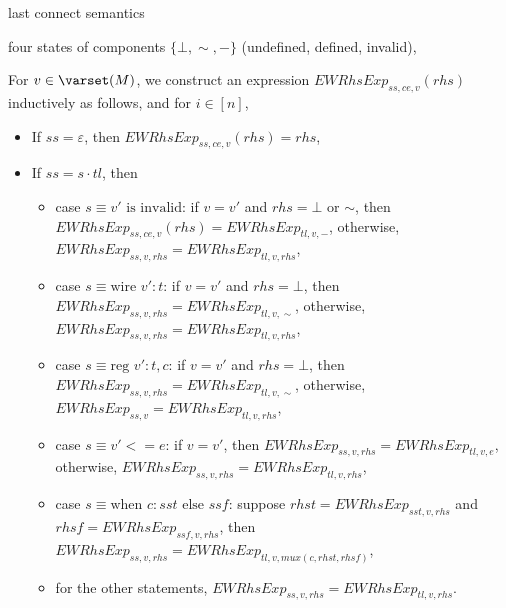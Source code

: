 {last connect semantics

four states of components $\{\bot, \sim, -\}$ (undefined, defined, invalid),

For $v \in \varset(M)$, we construct an expression $EWRhsExp_{ss, ce, v}(rhs)$ inductively as follows,
and for $i \in [n]$,
\begin{itemize}
\item If $ss = \varepsilon$, then $EWRhsExp_{ss, ce, v}(rhs) = rhs$,
%
\item If $ss = s \cdot tl$, then
\begin{itemize}
\item case $s \equiv v' \mbox{ is invalid}$: if $v = v'$ and $rhs = \bot$ or $\sim$, then $EWRhsExp_{ss, ce, v}(rhs) = EWRhsExp_{tl, v, -}$, otherwise, $EWRhsExp_{ss, v, rhs} = EWRhsExp_{tl, v, rhs}$,
%
\item case $s \equiv \mbox{wire } v': t$: if $v = v'$ and $rhs = \bot$, then $EWRhsExp_{ss, v, rhs} = EWRhsExp_{tl, v, \sim}$, otherwise,  $EWRhsExp_{ss, v, rhs} = EWRhsExp_{tl, v, rhs}$,
%
\item case $s \equiv \mbox{reg } v': t, c$: if $v = v'$ and $rhs = \bot$, then $EWRhsExp_{ss, v, rhs} = EWRhsExp_{tl, v, \sim}$, otherwise, $EWRhsExp_{ss, v}  = EWRhsExp_{tl, v, rhs}$,
%
\item case $s \equiv v'<= e$: if $v = v'$, then $EWRhsExp_{ss, v, rhs} = EWRhsExp_{tl, v, e}$, otherwise,  $EWRhsExp_{ss, v, rhs} = EWRhsExp_{tl, v, rhs}$,
%
\item case $s \equiv \mbox{when } c: sst \mbox{ else } ssf$: suppose $rhst = EWRhsExp_{sst, v, rhs}$ and $rhsf = EWRhsExp_{ssf, v, rhs}$, then
$EWRhsExp_{ss, v, rhs} = EWRhsExp_{tl, v, mux(c, rhst, rhsf)}$,
%
%
\item for the other statements,  $EWRhsExp_{ss, v, rhs} = EWRhsExp_{tl, v, rhs}$.
%
%
%
\end{itemize}
\end{itemize}

}
